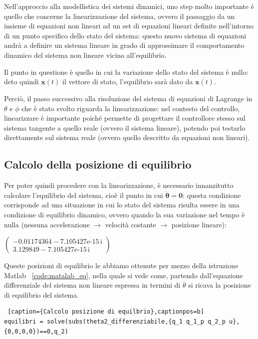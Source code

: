 Nell'approccio alla modellistica dei sistemi dinamici, uno step molto importante è quello che concerne la linearizzazione del sistema, ovvero il passaggio da un insieme di equazioni non lineari ad un set di equazioni lineari definite nell'intorno di un punto specifico dello stato del sistema: questo nuovo sistema di equazioni andrà a definire un sistema lineare in grado di approssimare il comportamento dinamico del sistema non lineare vicino all'equilibrio.

Il punto in questione è quello in cui la variazione dello stato del sistema è nullo: deto quindi $\mathbf{x}(t)$ il vettore di stato, l'equilibrio sarà dato da $\dot{\mathbf{x}(t)}$.

Perciò, il passo successivo alla risoluzione del sistema di equazioni di Lagrange in $\theta$ e $\phi$ che è stato svolto riguarda la linearizzazione: nel contesto del controllo, linearizzare è importante poiché permette di progettare il controllore stesso sul sistema tangente a quello reale (ovvero il sistema lineare), potendo poi testarlo direttamente sul sistema reale (ovvero quello descritto da equazioni non lineari).

\subsection{Calcolo della posizione di equilibrio}
Per poter quindi procedere con la linearizzazione, è necessario innanzitutto calcolare l'equilibrio del sistema, cioè il punto in cui $\mathbf{\ddot{\theta} = 0}$: questa condizione corrisponde  ad una situazione in cui lo stato del sistema risulta essere in una condizione di equilibrio dinamico, ovvero quando la sua variazione nel tempo è nulla (nessuna accelerazione $\rightarrow$ velocità costante $\rightarrow$ posizione lineare):
\begin{center}
	$\left(\begin{array}{c}
		-0.01174364-\text{7.105427e-15}\,\mathrm{i}\\
		3.129849-\text{7.105427e-15}\,\mathrm{i}
	\end{array}\right)$
\end{center}

Queste posizioni di equilibrio le abbiamo ottenute per mezzo della istruzione Matlab ~\ref{code:matalab_eq}, nella quale si vede come, partendo dall'equazione differenziale del sistema non lineare espressa in termini di $\ddot{\theta}$ si ricava la posizione di equilibrio del sistema.
\begin{lstlisting} [caption={Calcolo posizione di equilbrio},captionpos=b]
equilibri = solve(subs(theta2_differenziabile,{q_1 q_1_p q_2_p u},{0,0,0,0})==0,q_2)
\end{lstlisting}

